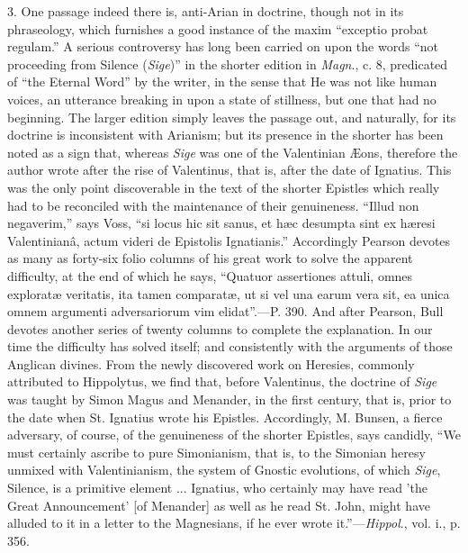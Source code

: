 3. One passage indeed there
is, anti-Arian in doctrine, though not in its phraseology, which
furnishes a good instance of the maxim ``exceptio probat regulam.'' A
serious controversy has long been carried on upon the words ``not
proceeding from Silence (\emph{Sige})'' in the shorter edition in \emph{Magn}.,
c. 8, predicated of ``the Eternal Word'' by the writer, in the sense
that He was not like human voices, an utterance breaking in upon a
state of stillness, but one that had no beginning. The larger edition
simply leaves the passage out, and naturally, for its doctrine is
inconsistent with Arianism; but its presence in the shorter has been
noted as a sign that, whereas \emph{Sige} was one of the Valentinian
Æons, therefore the author wrote after the rise of Valentinus, that
is, after the date of Ignatius. This was the only point discoverable
in the text of the shorter Epistles which really had to be reconciled
with the maintenance of their genuineness. ``Illud non negaverim,''
says Voss, ``si locus hic sit sanus, et hæc desumpta sint ex hæresi
Valentinianâ, actum videri de Epistolis Ignatianis.'' Accordingly
Pearson devotes as many as forty-six folio columns of his great work
to solve the apparent difficulty, at the end of which he says, ``Quatuor
assertiones attuli, omnes exploratæ veritatis, ita tamen comparatæ,
ut si vel una earum vera sit, ea unica omnem argumenti adversariorum
vim elidat''.—P. 390. And after Pearson, Bull devotes another series
of twenty columns to complete the explanation. In our time the
difficulty has solved itself; and consistently with the arguments of
those Anglican divines. From the newly discovered work on Heresies,
commonly attributed to Hippolytus, we find that, before Valentinus,
the doctrine of \emph{Sige} was taught by Simon Magus and Menander, in
the first century, that is, prior to the date when St. Ignatius wrote
his Epistles. Accordingly, M. Bunsen, a fierce adversary, of course,
of the genuineness of the shorter Epistles, says candidly, ``We must
certainly ascribe to pure Simonianism, that is, to the Simonian heresy
unmixed with Valentinianism, the system of Gnostic evolutions, of
which \emph{Sige}, Silence, is a primitive element ... Ignatius, who
certainly may have read 'the Great Announcement' [of Menander] as well
as he read St. John, might have alluded to it in a letter to the
Magnesians, if he ever wrote it.''—\emph{Hippol}., vol. i., p. 356.

